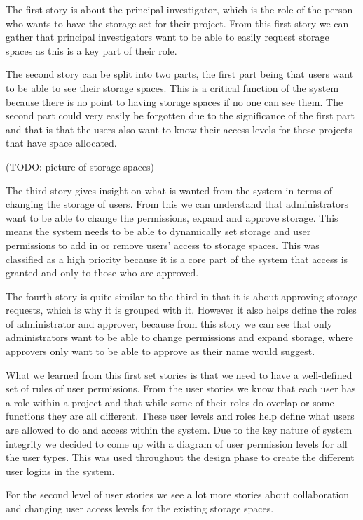 \documentclass[a4paper,titlepage,12pt]{article}
\begin{document}
The first story is about the principal investigator, which is the role of the
person who wants to have the storage set for their project. From this first
story we can gather that principal investigators want to be able to easily
request storage spaces as this is a key part of their role.

The second story can be split into two parts, the first part being that users
want to be able to see their storage spaces. This is a critical function of the
system because there is no point to having storage spaces if no one can see
them. The second part could very easily be forgotten due to the significance of
the first part and that is that the users also want to know their access levels
for these projects that have space allocated.

(TODO: picture of storage spaces)

The third story gives insight on what is wanted from the system in terms of
changing the storage of users. From this we can understand that administrators
want to be able to change the permissions, expand and approve storage. This
means the system needs to be able to dynamically set storage and user
permissions to add in or remove users' access to storage spaces. This was
classified as a high priority because it is a core part of the system that
access is granted and only to those who are approved.

The fourth story is quite similar to the third in that it is about approving
storage requests, which is why it is grouped with it. However it also helps
define the roles of administrator and approver, because from this story we can
see that only administrators want to be able to change permissions and expand
storage, where approvers only want to be able to approve as their name would
suggest.

What we learned from this first set stories is that we need to have a
well-defined set of rules of user permissions. From the user stories we know
that each user has a role within a project and that while some of their roles
do overlap or some functions they are all different. These user levels and
roles help define what users are allowed to do and access within the system.
Due to the key nature of system integrity we decided to come up with a diagram
of user permission levels for all the user types. This was used throughout the
design phase to create the different user logins in the system.

For the second level of user stories we see a lot more stories about
collaboration and changing user access levels for the existing storage spaces.
\end{document}
